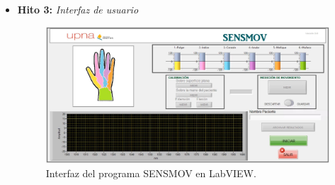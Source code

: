\begin{itemize} [label=]
\begin{enumerate}
		\item Realizar los ejercicio de rehabilitación con normalidad
		\item Pulsar el botón \underline{\textit{PAUSAR}}
	\end{enumerate}
		\hspace{1cm}\textbf{FINALIZACIÓN:}
	\begin{enumerate}
		\setcounter{enumi}{16}
		\item Pulsar el botón \underline{\textit{ARCHIVAR RESULTADOS}}
		\item Pulsar el botón \underline{\textit{SALIR}}
		\item Elegir en la pestaña emergente el nombre de archivo y carpeta para el informe de la sesión.
	\end{enumerate}

	\textit{\underline{Nota:}} Otro contratiempo encontrado en este prototipo son los problemas que da el software del interrogador, saltando alertas que no permiten seguir con la ejecución o tomando mal la señal óptica. Durante el desarrollo del proyecto se ha conseguido intuir el procedimiento en el que dichas alertas saltan con menos frecuencia y de ello surgen ciertos pasos del protocolo de medida. Por ejemplo, cuando se conecta el splitter a la fuente una vez que ya está en funcionamiento el software se reduce el número de veces en el que emergen las alertas.
	
	\textcolor{rositaoscuro}{Esto me parece importante comentarlo, el problema que da el software al iniciarlo. Tengo apuntadas las descripciones de los fallos, pero creo que igual es demasiado }
	
	\item \textbf{Hito 3:} \textit{Interfaz de usuario}
	
	\begin{figure}[H]
		\centering
		\includegraphics[width=1\textwidth]{./img/interfazSMinicio}
		\caption{Interfaz del programa SENSMOV en LabVIEW.}
		\label{fig:interfazinicio}
	\end{figure}
	 

\end{itemize}
